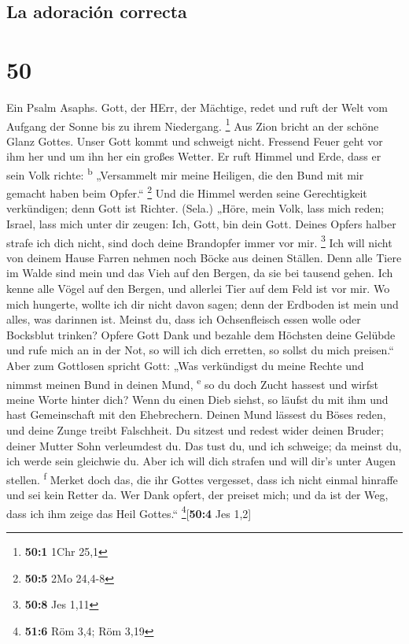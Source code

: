 \hypertarget{la-adoraciuxf3n-correcta}{%
\subsection{La adoración correcta}\label{la-adoraciuxf3n-correcta}}

\hypertarget{section-49}{%
\section{50}\label{section-49}}

 Ein Psalm Asaphs. Gott, der HErr, der Mächtige, redet und
ruft der Welt vom Aufgang der Sonne bis zu ihrem Niedergang. \footnote{\textbf{50:1}
  1Chr 25,1}  Aus Zion bricht an der schöne Glanz Gottes.
 Unser Gott kommt und schweigt nicht. Fressend Feuer geht
vor ihm her und um ihn her ein großes Wetter.  Er ruft
Himmel und Erde, dass er sein Volk richte: \textsuperscript{b}
 „Versammelt mir meine Heiligen, die den Bund mit mir
gemacht haben beim Opfer.`` \footnote{\textbf{50:5} 2Mo 24,4-8}
 Und die Himmel werden seine Gerechtigkeit verkündigen;
denn Gott ist Richter. (Sela.)  „Höre, mein Volk, lass
mich reden; Israel, lass mich unter dir zeugen: Ich, Gott, bin dein
Gott.  Deines Opfers halber strafe ich dich nicht, sind
doch deine Brandopfer immer vor mir. \footnote{\textbf{50:8} Jes 1,11}
 Ich will nicht von deinem Hause Farren nehmen noch Böcke
aus deinen Ställen.  Denn alle Tiere im Walde sind mein
und das Vieh auf den Bergen, da sie bei tausend gehen. 
Ich kenne alle Vögel auf den Bergen, und allerlei Tier auf dem Feld ist
vor mir.  Wo mich hungerte, wollte ich dir nicht davon
sagen; denn der Erdboden ist mein und alles, was darinnen ist.
 Meinst du, dass ich Ochsenfleisch essen wolle oder
Bocksblut trinken?  Opfere Gott Dank und bezahle dem
Höchsten deine Gelübde  und rufe mich an in der Not, so
will ich dich erretten, so sollst du mich preisen.`` 
Aber zum Gottlosen spricht Gott: „Was verkündigst du meine Rechte und
nimmst meinen Bund in deinen Mund, \textsuperscript{e} 
so du doch Zucht hassest und wirfst meine Worte hinter dich?
 Wenn du einen Dieb siehst, so läufst du mit ihm und hast
Gemeinschaft mit den Ehebrechern.  Deinen Mund lässest du
Böses reden, und deine Zunge treibt Falschheit.  Du
sitzest und redest wider deinen Bruder; deiner Mutter Sohn verleumdest
du.  Das tust du, und ich schweige; da meinst du, ich
werde sein gleichwie du. Aber ich will dich strafen und will dir's unter
Augen stellen. \textsuperscript{f}  Merket doch das, die
ihr Gottes vergesset, dass ich nicht einmal hinraffe und sei kein Retter
da.  Wer Dank opfert, der preiset mich; und da ist der
Weg, dass ich ihm zeige das Heil Gottes.`` \footnote{\textbf{51:6} Röm
  3,4; Röm 3,19}{[}\textbf{50:4} Jes 1,2{]}

